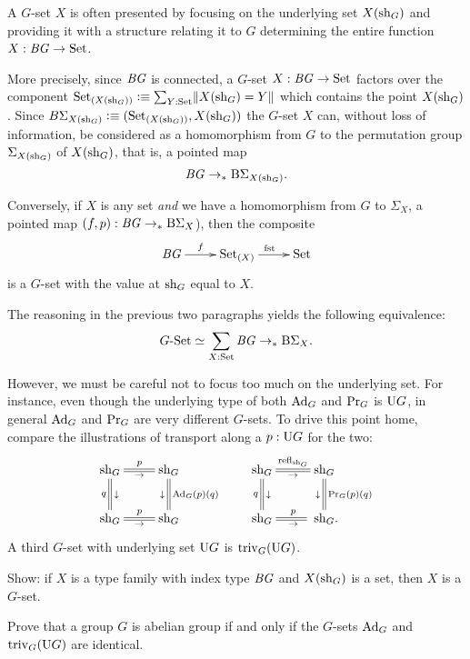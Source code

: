 \begin{remark}
  \label{remark:GsetsareGsets}
  A $G$-set $X$ is often presented by focusing on the underlying set $X(\mathrm{sh}_G)$ 
and providing it with a structure relating it to $G$ determining 
the entire function $X : \mathit{B}\mathit{G}\to\mathrm{Set}$.

More precisely, since $\mathit{B}\mathit{G}$ is connected, a $G$-set $X : \mathit{B}\mathit{G}\to\mathrm{Set}$ factors 
over the component $\conncomp \Set {X(\sh_G)} \defequi \sum_{Y:\Set}\Trunc{X(\sh_G)=Y}$ 
which contains the point $X(\mathrm{sh}_G)$.  
Since $B\Sigma_{X(\sh_G)}\defequi(\conncomp \Set {X(\sh_G)},X(\sh_G))$ the $G$-set $X$ can, 
without loss of information, be considered as a homomorphism from $G$ to 
the permutation group $\Sigma_{X(\mathrm{sh}_G)}$ of $X(\mathrm{sh}_G)$,
that is, a pointed map 
$$\mathit{B}\mathit{G}\to_\ast\mathrm{B}\Sigma_{X(\mathrm{sh}_G)}.$$ 

Conversely, if $X$ is any set \emph{and} we have a homomorphism 
from $G$ to $\Sigma_X$, \ie a pointed map $(f,p) : \mathit{B}\mathit{G}\to_\ast \mathrm{B}\Sigma_{X}$), 
then the composite
$$\xymatrix{\BG\ar[r]^-{f}&\conncomp \Set X \ar[r]^{\fst}&\Set}$$
is a $G$-set with the value at $\mathrm{sh}_G$ equal to $X$.

The reasoning in the previous two paragraphs yields the following equivalence:
\[
\mathord{G\textrm{-}\mathrm{Set}} \simeq \sum_{X:\mathrm{Set}} \mathit{B}\mathit{G} \to_\ast \mathrm{B}\Sigma_X.
\]

However, we must be careful not to focus too much on the underlying set.  
For instance, even though the underlying type of both $\Ad_G$ and $\mathrm{Pr}_{{G}}$ is $\mathrm{U} G$, in general  $\Ad_G$ and $\mathrm{Pr}_{{G}}$  are very different $G$-sets.  
To drive this point home, compare the illustrations of transport along a $p:\mathrm{U} G$ for the two:
$$\xymatrix{\sh_G\ar@{=}[r]^p_\to\ar@{=}[d]_q^\downarrow&\sh_G\ar@{=}[d]^{\Ad_G(p)(q)}_\downarrow\\
\sh_G\ar@{=}[r]^p_\to&\sh_G}                 \qquad
\xymatrix{\sh_G\ar@{=}[r]^{\refl{\sh_G}}_\to\ar@{=}[d]_q^\downarrow&\sh_G\ar@{=}[d]^{\princ G(p)(q)}_\downarrow\\
\sh_G\ar@{=}[r]^p_\to&{\hphantom{.}}\sh_G.}$$
A third $G$-set with underlying set $\mathrm{U} G$ is $\mathrm{triv}_G(\mathrm{U} G)$.
\end{remark}

\begin{xca}
Show:  if $X$ is a type family with index type $\mathit{B}\mathit{G}$ and $X(\mathrm{sh}_G)$ is a set, 
then $X$ is a $G$-set.
\end{xca}

\begin{xca}
  Prove that a group $G$ is abelian group if and only if the $G$-sets $\Ad_G$ and $\mathrm{triv}_G(\mathrm{U} G)$ are identical.
\end{xca}

